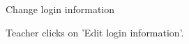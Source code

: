 
\begin{uc}{Change login information}


    \begin{uc-trig}
        Teacher clicks on 'Edit login information'.
    \end{uc-trig}

\end{uc}

